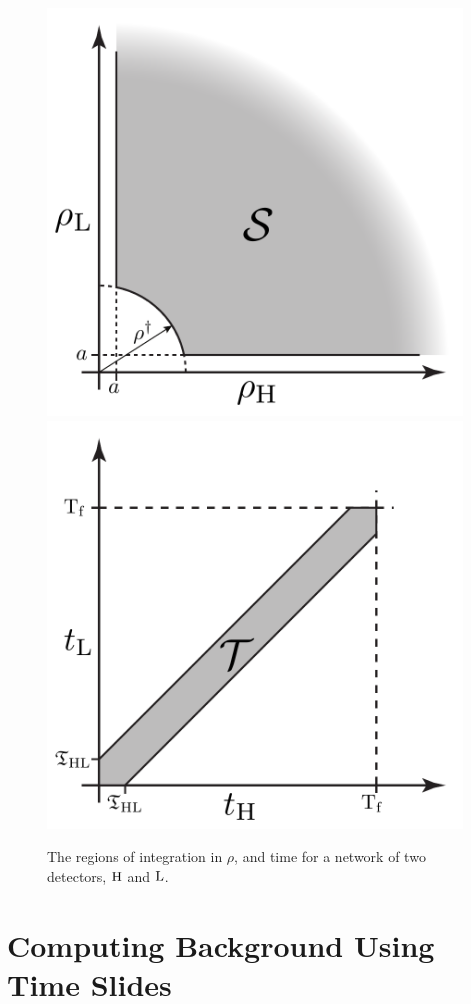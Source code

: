 \begin{figure}[p]
\label{fig:snr_time_integral}
\begin{center}
\includegraphics[height=4.25in]{figures/SNRintegrationRegion.pdf} \\
\includegraphics[height=4.25in]{figures/TimeIntegrationRegion.pdf}
\end{center}
\caption{The regions of integration in $\rho$, and time for a network of two detectors, $\mathrm{H}$ and $\mathrm{L}$.}
\end{figure}

\section{Computing Background Using Time Slides}
\label{sec:using_time_slides}


